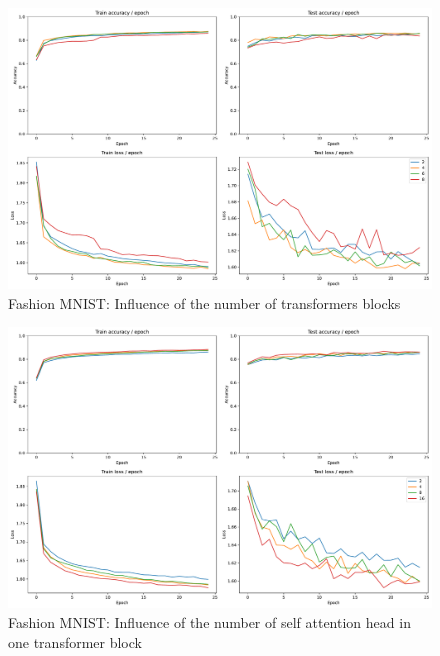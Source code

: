 \begin{figure}[H]
    \centering
    \includegraphics*[width=\textwidth]{figs/Transformers/fashion-MNIST/nb_block_influence_25.pdf}
    \caption{Fashion MNIST: Influence of the number of transformers blocks}
    \label{fig:fashion:nb_block_influence}
\end{figure}

\begin{figure}[H]
    \centering
    \includegraphics*[width=\textwidth]{figs/Transformers/fashion-MNIST/num_heads_influence_25.pdf}
    \caption{Fashion MNIST: Influence of the number of self attention head in one transformer block }
    \label{fig:fashion:num_heads_influence}
\end{figure}

